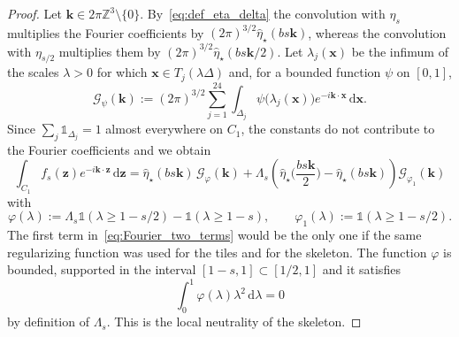\documentclass[final,reqno]{amsart}
\theoremstyle{remark}
\renewcommand{\ge}{\geqslant}
\let\phi=\varphi
\newcommand{\wh}[1]{\widehat{#1}}
\newcommand{\ZZ}{\mathbb{Z}}
\newcommand{\iden}{\mathbb{1}}
\newcommand{\tetra}{\mathbb{\Delta}}
\newcommand{\dd}{\mathrm{d}}
\newcommand{\GC}{\mathcal{G}}
\begin{document}
\begin{proof}
Let $\mathbf{k}\in2\pi\ZZ^3\setminus\{0\}$. By~\cref{eq:def_eta_delta} the convolution with $\eta_{s}$ multiplies the Fourier coefficients by $(2\pi)^{3/2}\wh{\eta}_\star(bs\mathbf{k})$, whereas the convolution with $\eta_{s/2}$ multiplies them by $(2\pi)^{3/2}\wh{\eta}_\star(bs\mathbf{k}/2)$. Let $\lambda_j(\mathbf{x})$ be the infimum of the scales $\lambda>0$ for which $\mathbf{x}\in T_j(\lambda\tetra)$ and, for a bounded function $\psi$ on $[0,1]$,
$$
\GC_\psi(\mathbf{k}):=(2\pi)^{3/2}\sum_{j=1}^{24}\int_{\tetra_j}\psi\big(\lambda_j(\mathbf{x})\big)e^{-i\mathbf{k}\cdot \mathbf{x}}\,\dd \mathbf{x}.
$$
Since $\sum_j\iden_{\tetra_j}=1$ almost everywhere on $C_1$, the constants do not contribute to the Fourier coefficients and we obtain
\begin{equation}\label{eq:Fourier_two_terms}
\int_{C_1}f_{s}(\mathbf{z})e^{-i\mathbf{k}\cdot \mathbf{z}}\,\dd \mathbf{z}=\wh{\eta}_\star(bs\mathbf{k})\,\GC_\phi(\mathbf{k})+\Lambda_s\left(\wh{\eta}_\star\Big(\frac{bs\mathbf{k}}{2}\Big)-\wh{\eta}_\star(bs\mathbf{k})\right)\GC_{\phi_1}(\mathbf{k})
\end{equation}
with
$$
\phi(\lambda):=\Lambda_s\iden(\lambda\ge1-s/2)-\iden(\lambda\ge1-s),\qquad \phi_1(\lambda):=\iden(\lambda\ge1-s/2).
$$
The first term in~\cref{eq:Fourier_two_terms} would be the only one if the same regularizing function was used for the tiles and for the skeleton. The function $\phi$ is bounded, supported in the interval $[1-s,1]\subset[1/2,1]$ and it satisfies
\begin{equation}\label{eq:neutral_skeleton}
\int_0^1\phi(\lambda)\lambda^2\,\dd\lambda=0
\end{equation}
by definition of $\Lambda_s$. This is the local neutrality of the skeleton.


\end{proof}
\end{document}
